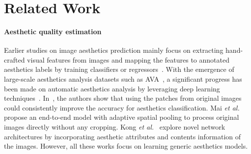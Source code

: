 \section{Related Work}
\paragraph{Aesthetic quality estimation}

Earlier studies on image aesthetics prediction mainly focus on extracting hand-crafted visual features from images and mapping the features to annotated aesthetics labels by training classifiers or regressors~\cite{dhar2011high, ke2006design, luo2011content, marchesotti2011assessing}. 
With the emergence of large-scale aesthetics analysis datasets such as AVA~\cite{murray2012ava}, a significant progress has been made on automatic aesthetics analysis by leveraging deep learning techniques~\cite{kang2014convolutional, lu2014rapid, lu2015deep, wang2016brain}. In~\cite{lu2014rapid, lu2015deep}, the authors show that using the patches from original images could consistently improve the accuracy for aesthetics classification. Mai \textsl{et al.}~\cite{mai2016composition} propose an end-to-end model with adaptive spatial pooling to process original images directly without any cropping. Kong \textsl{et al.}~\cite{kong2016photo} explore novel network architectures by incorporating aesthetic attributes and contents information of the images. However, all these works focus on learning generic aesthetics models.  
